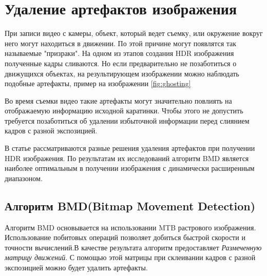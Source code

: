 \section {Удаление артефактов изображения}

При записи видео с камеры, объект, который ведет съемку, или окружение вокруг него могут находиться в движении. По этой причине могут появлятся так называемые "призраки". На одном из этапов создания HDR изображения полученные кадры сливаются. Но если предварительно не позаботиться о движущихся объектах, на результирующем изображении можно наблюдать подобные артефакты, пример на изображении \ref{fig:ghosting}

\begin{figure}[ht!]
\end{figure}

Во время съемки видео такие артефакты могут значительно повлиять на отображаемую информацию исходной каратинки. Чтобы этого не допустить требуется позаботиться об удалении избыточной информации перед слиянием кадров с разной экспозицией.

В статье \cite{bib5} рассматриваются разные решения удаления артефактов при получении HDR изображения. По результатам их исследований алгоритм BMD является наиболее оптимальным в получении изображения с динамически расширенным диапазоном.

\subsection { Алгоритм BMD(Bitmap Movement Detection)}

Алгоритм BMD\cite{bib5} основывается на использовании MTB\cite{bib4} растрового изображения. Использование побитовых операций позволяет добиться быстрой скорости и точности вычислений.В качестве результата алгоритм предоставляет \textit{ Размеченную матрицу движений}. С помощью этой матрицы при склеивании кадров с разной экспозицией можно будет удалить артефакты.


